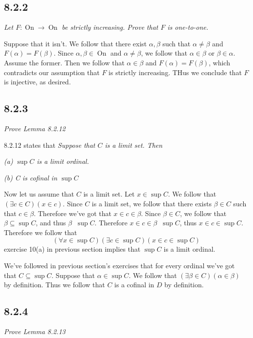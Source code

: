 \documentclass[11pt,oneside,titlepage]{book}
\DeclareMathOperator \On {On}
\DeclareMathOperator \ineq {\underline{\in}}
\begin{document}
\subsection*{8.2.2}

\textit{Let $F: \On \to \On$ be strictly increasing. Prove that $F$ is one-to-one.}

Suppose that it isn't. We follow that there exist $\alpha, \beta$
such that $\alpha \neq \beta$ and  $F(\alpha) = F(\beta)$. Since
$\alpha, \beta \in \On$ and $\alpha \neq \beta$, we follow that $\alpha \in \beta$
or $\beta \in \alpha$. Assume the former. Then we follow that $\alpha \in \beta$
and $F(\alpha) = F(\beta)$, which contradicts our assumption that $F$ is strictly
increasing. THus we conclude that $F$ is injective, as desired.

\subsection*{8.2.3}

\textit{Prove Lemma 8.2.12}

8.2.12 states that
\textit{Suppose that $C$ is a limit set. Then }

\textit{(a) $\sup C$ is a limit ordinal.}

\textit{(b) C is cofinal in $\sup C$}

Now let us assume that $C$ is a limit set. Let $x \in \sup{C}$. We follow that
$(\exists c \in C)(x \in c)$. Since $C$ is a limit set, we follow that there exists $\beta \in C$
such that $c \in \beta$. Therefore we've got that $x \in c \in \beta$. Since $\beta \in C$,
we follow that $\beta \subseteq \sup C$, and thus $\beta \ineq \sup C$. Therefore
$x \in c \in \beta \ineq \sup C$, thus $x \in c \in \sup C$. Therefore we follow that
$$(\forall x \in \sup C)(\exists c \in \sup C)(x \in c \in \sup C)$$
exercise 10(a) in previous section implies that $\sup C$ is a limit ordinal.

We've followed in previous section's exercises that for every ordinal we've got that
$C \subseteq \sup{C}$. Suppose that $\alpha \in \sup{C}$.
We follow that $(\exists \beta \in C)(\alpha \in \beta)$ by definition. Thus we follow
that $C$ is a cofinal in $D$ by definition.

\subsection*{8.2.4}

\textit{Prove Lemma 8.2.13}
\end{document}
